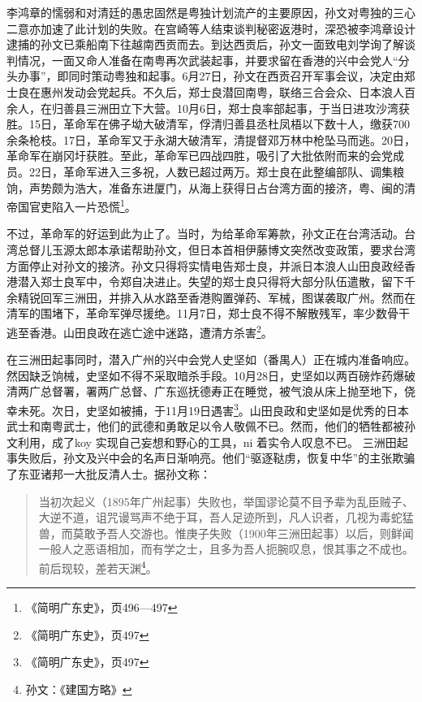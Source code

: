 李鸿章的懦弱和对清廷的愚忠固然是粤独计划流产的主要原因，孙文对粤独的三心二意亦加速了此计划的失败。在宫崎等人结束谈判秘密返港时，深恐被李鸿章设计逮捕的孙文已乘船南下往越南西贡而去。到达西贡后，孙文一面致电刘学询了解谈判情况，一面又命人准备在南粤再次武装起事，并要求留在香港的兴中会党人“分头办事”，即同时策动粤独和起事。6月27日，孙文在西贡召开军事会议，决定由郑士良在惠州发动会党起兵。不久后，郑士良潜回南粤，联络三合会众、日本浪人百余人，在归善县三洲田立下大营。10月6日，郑士良率部起事，于当日进攻沙湾获胜。15日，革命军在佛子坳大破清军，俘清归善县丞杜凤梧以下数十人，缴获700余条枪枝。17日，革命军又于永湖大破清军，清提督邓万林中枪坠马而逃。20日，革命军在崩冈圩获胜。至此，革命军已四战四胜，吸引了大批依附而来的会党成员。22日，革命军进入三多祝，人数已超过两万。郑士良在此整编部队、调集粮饷，声势颇为浩大，准备东进厦门，从海上获得日占台湾方面的接济，粤、闽的清帝国官吏陷入一片恐慌\footnote{《简明广东史》，页496—497}。

不过，革命军的好运到此为止了。当时，为给革命军筹款，孙文正在台湾活动。台湾总督儿玉源太郎本承诺帮助孙文，但日本首相伊藤博文突然改变政策，要求台湾方面停止对孙文的接济。孙文只得将实情电告郑士良，并派日本浪人山田良政经香港潜入郑士良军中，令郑自决进止。失望的郑士良只得将大部分队伍遣散，留下千余精锐回军三洲田，并排入从水路至香港购置弹药、军械，图谋袭取广州。然而在清军的围堵下，革命军弹尽援绝。11月7日，郑士良不得不解散残军，率少数骨干逃至香港。山田良政在逃亡途中迷路，遭清方杀害\footnote{《简明广东史》，页497}。

在三洲田起事同时，潜入广州的兴中会党人史坚如（番禺人）正在城内准备响应。然因缺乏饷械，史坚如不得不采取暗杀手段。10月28日，史坚如以两百磅炸药爆破清两广总督署，署两广总督、广东巡抚德寿正在睡觉，被气浪从床上抛至地下，侥幸未死。次日，史坚如被捕，于11月19日遇害\footnote{《简明广东史》，页497}。山田良政和史坚如是优秀的日本武士和南粤武士，他们的武德和勇敢足以令人敬佩不已。然而，他们的牺牲都被孙文利用，成了koy 实现自己妄想和野心的工具，ni 着实令人叹息不已。
三洲田起事失败后，孙文及兴中会的名声日渐响亮。他们“驱逐鞑虏，恢复中华”的主张欺骗了东亚诸邦一大批反清人士。据孙文称：

\begin{quote}
当初次起义（1895年广州起事）失败也，举国谬论莫不目予辈为乱臣贼子、大逆不道，诅咒谩骂声不绝于耳，吾人足迹所到，凡人识者，几视为毒蛇猛兽，而莫敢予吾人交游也。惟庚子失败（1900年三洲田起事）以后，则鲜闻一般人之恶语相加，而有学之士，且多为吾人扼腕叹息，恨其事之不成也。前后现较，差若天渊\footnote{孙文：《建国方略》}。
\end{quote}

